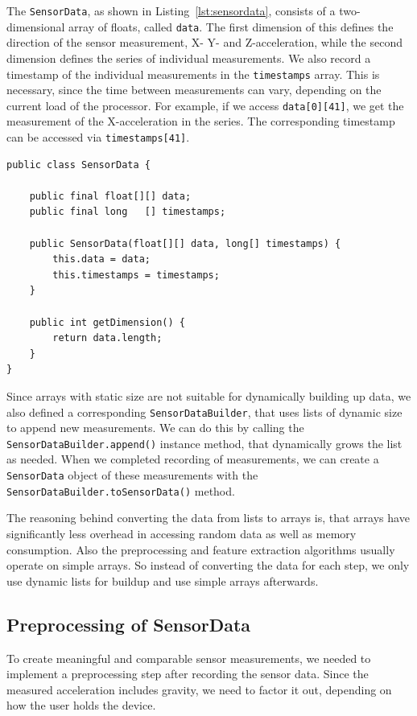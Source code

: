 The \lstinline$SensorData$, as shown in Listing~\ref{lst:sensordata}, consists of a two-dimensional array of floats, called \lstinline$data$. The first dimension of this defines the direction of the sensor measurement, \ie X- Y- and Z-acceleration, while the second dimension defines the series of individual measurements. We also record a timestamp of the individual measurements in the \lstinline$timestamps$ array. This is necessary, since the time between measurements can vary, depending on the current load of the processor.
For example, if we access \lstinline$data[0][41]$, we get the  measurement of the X-acceleration in the series. The corresponding timestamp can be accessed via \lstinline$timestamps[41]$.

\begin{lstlisting}[float,
caption={Class \lstinline$SensorData$ containing the raw sensor readings},
label={lst:sensordata}]
public class SensorData {
    
    public final float[][] data;
    public final long   [] timestamps;

    public SensorData(float[][] data, long[] timestamps) {
        this.data = data;
        this.timestamps = timestamps;
    }

    public int getDimension() {
        return data.length;
    }
}
\end{lstlisting}

Since arrays with static size are not suitable for dynamically building up data, we also defined a corresponding \lstinline$SensorDataBuilder$, that uses lists of dynamic size to append new measurements. We can do this by calling the \lstinline$SensorDataBuilder.append()$ instance method, that dynamically grows the list as needed. When we completed recording of measurements, we can create a \lstinline$SensorData$ object of these measurements with the \lstinline$SensorDataBuilder.toSensorData()$ method.

The reasoning behind converting the data from lists to arrays is, that arrays have significantly less overhead in accessing random data as well as memory consumption. Also the preprocessing and feature extraction algorithms usually operate on simple arrays. So instead of converting the data for each step, we only use dynamic lists for buildup and use simple arrays afterwards.

\subsection{Preprocessing of SensorData}
To create meaningful and comparable sensor measurements, we needed to implement a preprocessing step after recording the sensor data. Since the measured acceleration includes gravity, we need to factor it out, depending on how the user holds the device.


